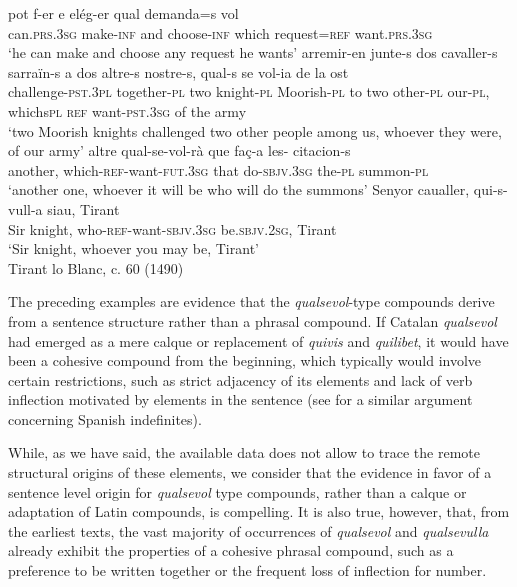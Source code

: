 \documentclass[output=paper,colorlinks,citecolor=brown]{langscibook}
\begin{document}
\ea \label{ex:ka7}
\ea\label{ex:ka7a}  
        \gll pot f-er e elég-er qual demanda=s vol\\
        can.\textsc{prs.3sg} make-\textsc{inf} and choose-\textsc{inf} which request=\textsc{ref} want.\textsc{prs.3sg}\\
        \glt ‘he can make and choose any request he wants’
\ex\label{ex:ka7b}  
        \gll arremir-en junte-s dos cavaller-s sarraïn-s a dos altre-s nostre-s, qual-s se vol-ia de la ost\\
        challenge-\textsc{pst.3pl} together-\textsc{pl} two knight-\textsc{pl} Moorish-\textsc{pl} to two other-\textsc{pl} our-\textsc{pl}, whichs\textsc{pl} \textsc{ref} want-\textsc{pst.3sg} of the army\\
		\glt ‘two Moorish knights challenged two other people among us, whoever 		they were, of our army’
\ex\label{ex:ka7c}  
        \gll altre qual-se-vol-rà que faç-a les- citacion-s\\
        another, which-\textsc{ref}-want-\textsc{fut.3sg} that do-\textsc{sbjv.3sg} the-\textsc{pl} summon-\textsc{pl}\\
        \glt‘another one, whoever it will be who will do the summons’ 
\ex\label{ex:ka7d}
        \gll Senyor caualler, qui-s-vull-a siau, Tirant\\
        Sir knight, who-\textsc{ref}-want-\textsc{sbjv.3sg} be.\textsc{sbjv.2sg}, Tirant\\
        \glt ‘Sir knight, whoever you may be, Tirant’\\
        Tirant lo Blanc, c. 60 (1490)
\z
\z

The preceding examples are evidence that the \textit{qualsevol}-type compounds derive from a sentence structure rather than a phrasal compound. If Catalan \textit{qualsevol} had emerged as a mere calque or replacement of \textit{quivis} and \textit{quilibet}, it would have been a cohesive compound from the beginning, which typically would involve certain restrictions, such as strict adjacency of its elements and lack of verb inflection motivated by elements in the sentence (see \cite[][1113]{CompanyCompanyPozasLoyo2009} for a similar argument concerning Spanish indefinites).

While, as we have said, the available data does not allow to trace the remote structural origins of these elements, we consider that the evidence in favor of a sentence level origin for \textit{qualsevol} type compounds, rather than a calque or adaptation of Latin compounds, is compelling. It is also true, however, that, from the earliest texts, the vast majority of occurrences of \textit{qualsevol} and \textit{qualsevulla} already exhibit the properties of a cohesive phrasal compound, such as a preference to be written together or the frequent loss of inflection for number.
\end{document}
